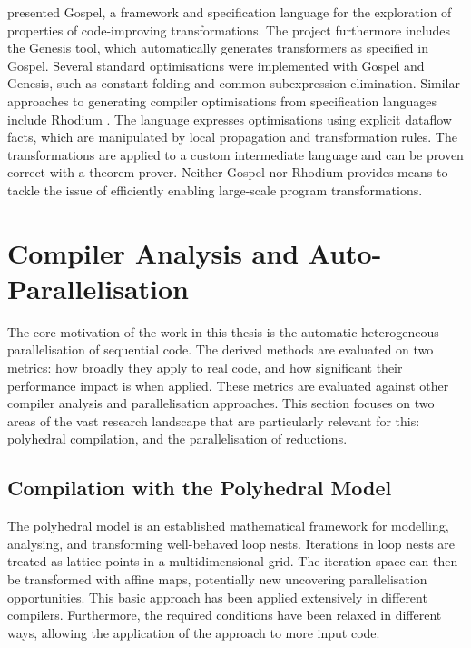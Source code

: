     \citet{Whitfield:1997:AEC:267959.267960} presented Gospel, a framework and
    specification language for the exploration of properties of code-improving
    transformations.
    The project furthermore includes the Genesis tool, which automatically
    generates transformers as specified in Gospel.
    Several standard optimisations were implemented with Gospel and Genesis,
    such as constant folding and common subexpression elimination.
    Similar approaches to generating compiler optimisations from specification
    languages include Rhodium \citep{Lerner:2005:ASP:1040305.1040335}.
    The language expresses optimisations using explicit dataflow facts, which
    are manipulated by local propagation and transformation rules.
    The transformations are applied to a custom intermediate language and can
    be proven correct with a theorem prover.
    Neither Gospel nor Rhodium provides means to tackle the issue of efficiently
    enabling large-scale program transformations.

\section{Compiler Analysis and Auto-Parallelisation}

    The core motivation of the work in this thesis is the automatic
    heterogeneous parallelisation of sequential code.
    The derived methods are evaluated on two metrics: how broadly they apply to
    real code, and how significant their performance impact is when applied.
    These metrics are evaluated against other compiler analysis and
    parallelisation approaches.
    This section focuses on two areas of the vast research landscape
    that are particularly relevant for this: polyhedral compilation, and the
    parallelisation of reductions.

\subsection{Compilation with the Polyhedral Model}

    The polyhedral model \citep{Karp:1967:OCU:321406.321418} is an established
    mathematical framework for modelling, analysing, and transforming
    well-behaved loop nests.
    Iterations in loop nests are treated as lattice points in a multidimensional
    grid.
    The iteration space can then be transformed with affine maps, potentially
    new uncovering parallelisation opportunities.
    This basic approach has been applied extensively in different compilers.
    Furthermore, the required conditions have been relaxed in different ways,
    allowing the application of the approach to more input code.

